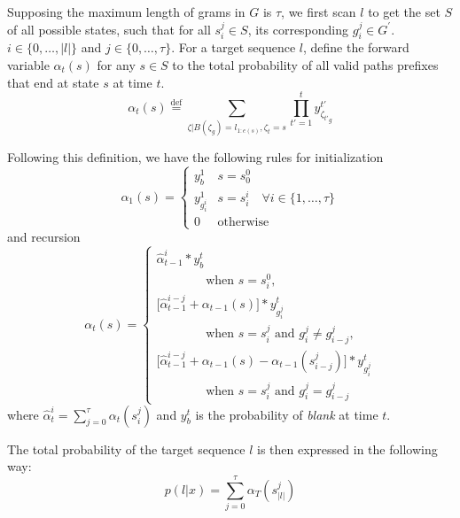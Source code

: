 \documentclass{article}
\begin{document}
Supposing the maximum length of grams in $G$ is $\tau$, we first scan $l$ to get the set $S$ of all possible states, such that for all $s_i^j \in S$, its corresponding $g_i^j\in G^{\prime}$. $i\in\{0,\ldots,|l|\}$ and $j\in \{0,\ldots,\tau\}$. For a target sequence $l$, define the forward variable $\alpha_t(s)$ for any $s\in S$ to the total probability of all valid paths prefixes that end at state $s$ at time $t$.
\begin{equation}
\alpha_t(s)\stackrel{\text{def}}{=}\sum_{\zeta | B(\zeta_g)=l_{1:e(s)}, \zeta_t=s} \prod_{t'=1}^{t} y_{{\zeta_{t'}}_g}^{t'}
\end{equation}

Following this definition, we have the following rules for initialization
\begin{equation}
\alpha_1(s)=
\left \{
  \begin{array}{cl}
  y_b^1 & s = s_0^0 \\
  y_{g_i^i}^1 & s = s_i^i \quad \forall i\in\{1,\ldots,\tau\} \\
  0 & \text{otherwise}
  \end{array}
\right.
\end{equation}
and recursion
\begin{equation}
\alpha_t(s)=
\left \{
  \begin{array}{l}
  \hat{\alpha}_{t-1}^i*y^t_b \\ 
    ~~~~~~~~~~~~~~~~~~ \text{when } s = s_i^0,  \\
  \lbrack\hat{\alpha}_{t-1}^{i-j} + \alpha_{t-1}(s)\rbrack*y^t_{g_i^j}  \\ 
    ~~~~~~~~~~~~~~~~~~ \text{when }s = s_i^j\text{ and }g_i^j\neq g_{i-j}^j,  \\
  \lbrack\hat{\alpha}_{t-1}^{i-j} + \alpha_{t-1}(s) - \alpha_{t-1}(s_{i-j}^j)\rbrack*y^t_{g_i^j} \\ 
    ~~~~~~~~~~~~~~~~~~ \text{when }s = s_i^j\text{ and }g_i^j = g_{i-j}^j  
  \end{array}
\right.
\end{equation}
where $\hat{\alpha}_t^i = \sum_{j=0}^{\tau}\alpha_t(s_i^j)$ and $y^t_b$ is the probability of \emph{blank} at time $t$.

The total probability of the target sequence $l$ is then expressed in the following way:
\begin{equation}
p(l|x) = \sum_{j=0}^{\tau}\alpha_T(s_{|l|}^j)
\end{equation}
\end{document}
